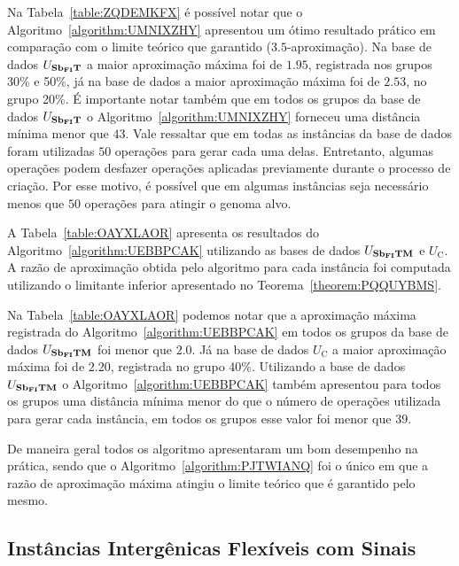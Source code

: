 

% 

Na Tabela~\ref{table:ZQDEMKFX} é possível notar que o Algoritmo~\ref{algorithm:UMNIXZHY} apresentou um ótimo resultado prático em comparação com o limite teórico que garantido ($3.5$-aproximação). Na base de dados $U_{\textbf{Sb\textsubscript{FI}T}}{}$ a maior aproximação máxima foi de $1.95$, registrada nos grupos 30\% e 50\%, já na base de dados a maior aproximação máxima foi de $2.53$, no grupo 20\%. É importante notar também que em todos os grupos da base de dados $U_{\textbf{Sb\textsubscript{FI}T}}{}$ o Algoritmo~\ref{algorithm:UMNIXZHY} forneceu uma distância mínima menor que $43$. Vale ressaltar que em todas as instâncias da base de dados foram utilizadas $50$ operações para gerar cada uma delas. Entretanto, algumas operações podem desfazer operações aplicadas previamente durante o processo de criação. Por esse motivo, é possível que em algumas instâncias seja necessário menos que $50$ operações para atingir o genoma alvo.

A Tabela~\ref{table:OAYXLAOR} apresenta os resultados do Algoritmo~\ref{algorithm:UEBBPCAK} utilizando as bases de dados $U_{\textbf{Sb\textsubscript{FI}TM}}{}$ e $U_{\text{C}}$. A razão de aproximação obtida pelo algoritmo para cada instância foi computada utilizando o limitante inferior apresentado no Teorema~\ref{theorem:PQQUYBMS}.



% 

Na Tabela~\ref{table:OAYXLAOR} podemos notar que a aproximação máxima registrada do Algoritmo~\ref{algorithm:UEBBPCAK} em todos os grupos da base de dados $U_{\textbf{Sb\textsubscript{FI}TM}}{}$ foi menor que $2.0$. Já na base de dados $U_{\text{C}}$ a maior aproximação máxima foi de $2.20$, registrada no grupo 40\%. Utilizando a base de dados $U_{\textbf{Sb\textsubscript{FI}TM}}{}$ o Algoritmo~\ref{algorithm:UEBBPCAK} também apresentou para todos os grupos uma distância mínima menor do que o número de operações utilizada para gerar cada instância, em todos os grupos esse valor foi menor que $39$.

De maneira geral todos os algoritmo apresentaram um bom desempenho na prática, sendo que o Algoritmo~\ref{algorithm:PJTWIANQ} foi o único em que a razão de aproximação máxima atingiu o limite teórico que é garantido pelo mesmo. 

\subsection{Instâncias Intergênicas Flexíveis com Sinais}

